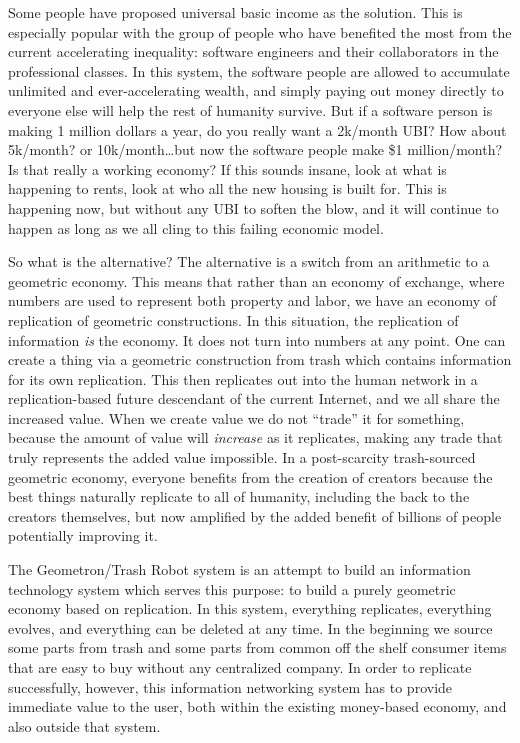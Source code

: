Some people have proposed universal basic income as the solution. This
is especially popular with the group of people who have benefited the
most from the current accelerating inequality: software engineers and
their collaborators in the professional classes. In this system, the
software people are allowed to accumulate unlimited and
ever-accelerating wealth, and simply paying out money directly to
everyone else will help the rest of humanity survive. But if a software
person is making 1 million dollars a year, do you really want a 2k/month
UBI? How about 5k/month? or 10k/month\ldots{}but now the software people
make \$1 million/month? Is that really a working economy? If this sounds
insane, look at what is happening to rents, look at who all the new
housing is built for. This is happening now, but without any UBI to
soften the blow, and it will continue to happen as long as we all cling
to this failing economic model.

So what is the alternative? The alternative is a switch from an
arithmetic to a geometric economy. This means that rather than an
economy of exchange, where numbers are used to represent both property
and labor, we have an economy of replication of geometric constructions.
In this situation, the replication of information \emph{is} the economy.
It does not turn into numbers at any point. One can create a thing via a
geometric construction from trash which contains information for its own
replication. This then replicates out into the human network in a
replication-based future descendant of the current Internet, and we all
share the increased value. When we create value we do not ``trade'' it
for something, because the amount of value will \emph{increase} as it
replicates, making any trade that truly represents the added value
impossible. In a post-scarcity trash-sourced geometric economy, everyone
benefits from the creation of creators because the best things naturally
replicate to all of humanity, including the back to the creators
themselves, but now amplified by the added benefit of billions of people
potentially improving it.

The Geometron/Trash Robot system is an attempt to build an information
technology system which serves this purpose: to build a purely geometric
economy based on replication. In this system, everything replicates,
everything evolves, and everything can be deleted at any time. In the
beginning we source some parts from trash and some parts from common off
the shelf consumer items that are easy to buy without any centralized
company. In order to replicate successfully, however, this information
networking system has to provide immediate value to the user, both
within the existing money-based economy, and also outside that system.

